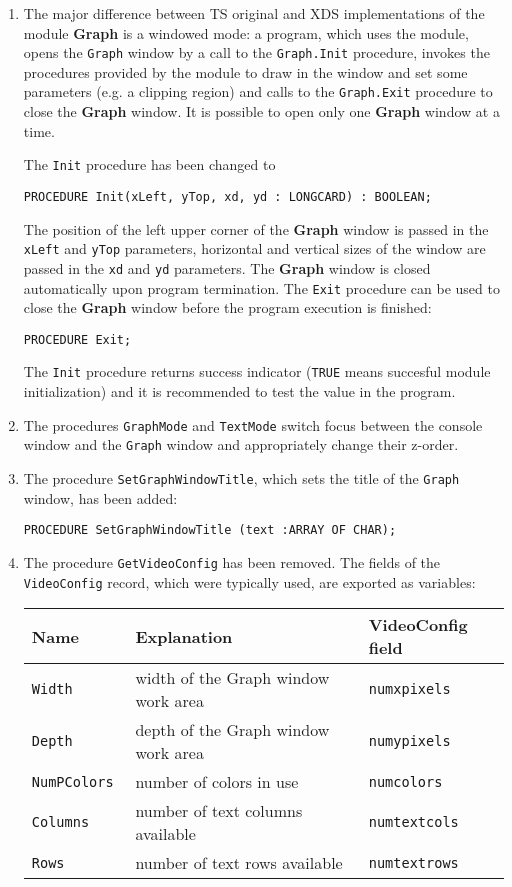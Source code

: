 \begin{enumerate}
\item The major difference between TS original and XDS implementations
      of the module {\bf Graph} is a windowed mode: a program, which uses the
      module, opens the \verb'Graph' window by a call to the \verb'Graph.Init'
      procedure, invokes the procedures provided by the module to draw in the
      window and set some parameters (e.g. a clipping  region) and calls to
      the \verb'Graph.Exit' procedure to close the {\bf Graph} window.
      It is possible to open only one {\bf Graph} window at a time.

      The \verb'Init' procedure has been changed to

      \verb'PROCEDURE Init(xLeft, yTop, xd, yd : LONGCARD) : BOOLEAN;'

      The position of the left upper corner of the {\bf Graph} window is passed in
      the \verb'xLeft' and \verb'yTop' parameters, horizontal and vertical sizes
      of the window are passed in the \verb'xd' and \verb'yd' parameters.
      The {\bf Graph} window is closed automatically upon program termination.
      The \verb'Exit' procedure can be used to close the {\bf Graph} window before
      the program execution is finished:

      \verb'PROCEDURE Exit;'

      The \verb'Init' procedure returns success indicator (\verb'TRUE' means succesful
      module initialization) and it is recommended to test the value in the
      program.
      
\item The procedures \verb'GraphMode' and \verb'TextMode' switch focus between
      the console window and the \verb'Graph' window and appropriately change
      their z-order.
 
\item The procedure \verb'SetGraphWindowTitle', which sets the title of the
      \verb'Graph' window, has been added:

      \verb'PROCEDURE SetGraphWindowTitle (text :ARRAY OF CHAR);'

\item The procedure \verb'GetVideoConfig' has been removed. The fields of the
      \verb'VideoConfig' record, which were typically used, are exported as variables:

      \begin{tabular}{l|l|l}
      \bf Name    &        \bf Explanation                & \bf VideoConfig field \\
      \hline
      \tt Width      & width of the Graph window work area  & \tt numxpixels            \\
      \tt Depth      & depth of the Graph window work area  & \tt numypixels            \\
      \tt NumPColors & number of colors in use              & \tt numcolors             \\
      \tt Columns    & number of text columns available     & \tt numtextcols           \\
      \tt Rows       & number of text rows available        & \tt numtextrows
      \end{tabular}


\end{enumerate}
